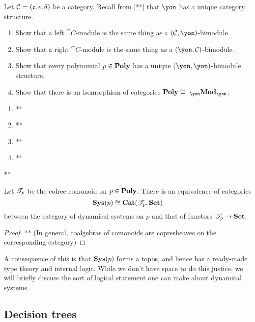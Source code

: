 \documentclass[Book-Poly]{subfiles}
\begin{document}
\begin{exercise}
Let $\mathcal{C}=(\mathfrak{c},\epsilon,\delta)$ be a category. Recall from \cref{**} that $\yon$ has a unique category structure.
\begin{enumerate}
	\item Show that a left $\cat{C}$-module is the same thing as a $(\cat{C},\yon)$-bimodule.
	\item Show that a right $\cat{C}$-module is the same thing as a $(\yon,\cat{C})$-bimodule.
	\item Show that every polynomial $p\in\mathbf{Poly}$ has a unique $(\yon,\yon)$-bimodule structure.
	\item Show that there is an isomorphism of categories $\poly\cong\bimod{\yon}{\yon}$.
\qedhere
\end{enumerate}
\begin{solution}
\begin{enumerate}
    \item **
    \item **
    \item **
    \item **
\end{enumerate}
\end{solution}
\end{exercise}














**

\begin{theorem}\label{thm.cofree_coalgebras}
Let $\mathscr{T}_{p}$ be the cofree comonoid on $p\in\mathbf{Poly}$. There is an equivalence of categories
\[
\mathbf{Sys}(p)\cong\mathbf{Cat}(\mathscr{T}_{p},\mathbf{Set})
\]
between the category of dynamical systems on $p$ and that of functors $\mathscr{T}_{p}\to\mathbf{Set}.$
\end{theorem}
\begin{proof}
** (In general, coalgebras of comonoids are copresheaves on the corresponding category)
\end{proof}
A consequence of this is that $\mathbf{Sys}(p)$ forms a topos, and hence has a ready-made type theory and internal logic. While we don't have space to do this justice, we will briefly discuss the sort of logical statement one can make about dynamical systems.

\subsection{Decision trees}
\end{document}
